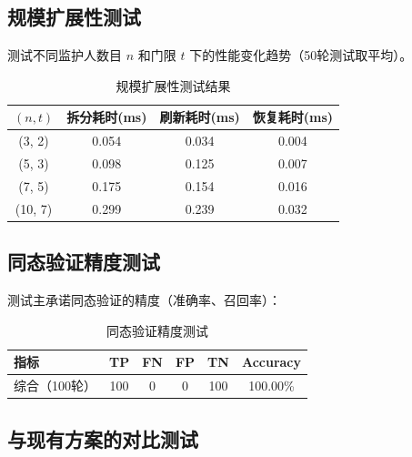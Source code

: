 \subsection{规模扩展性测试}

测试不同监护人数目 $n$ 和门限 $t$ 下的性能变化趋势（50轮测试取平均）。

\begin{table}[H]
    \centering
    \caption{规模扩展性测试结果}
    \label{tab:scalability}
    \begin{tabularx}{\textwidth}{cccc}
        \toprule
        $(n, t)$ & 拆分耗时(ms) & 刷新耗时(ms) & 恢复耗时(ms) \\
        \midrule
        (3, 2) & 0.054 & 0.034 & 0.004 \\
        (5, 3) & 0.098 & 0.125 & 0.007 \\
        (7, 5) & 0.175 & 0.154 & 0.016 \\
        (10, 7) & 0.299 & 0.239 & 0.032 \\
        \bottomrule
    \end{tabularx}
\end{table}

\subsection{同态验证精度测试}

测试主承诺同态验证的精度（准确率、召回率）：

\begin{table}[H]
    \centering
    \caption{同态验证精度测试}
    \label{tab:verify}
    \begin{tabularx}{\textwidth}{lccccc}
        \toprule
        \textbf{指标} & \textbf{TP} & \textbf{FN} & \textbf{FP} & \textbf{TN} & \textbf{Accuracy} \\
        \midrule
        综合（100轮） & 100 & 0 & 0 & 100 & 100.00\% \\
        \bottomrule
    \end{tabularx}
\end{table}

\subsection{与现有方案的对比测试}

